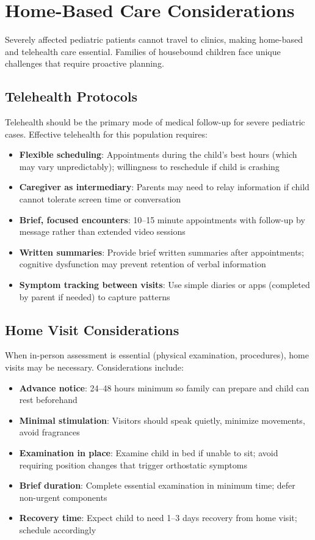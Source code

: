 \section{Home-Based Care Considerations}
\label{sec:ped-home-care}

Severely affected pediatric patients cannot travel to clinics, making home-based and telehealth care essential. Families of housebound children face unique challenges that require proactive planning.

\subsection{Telehealth Protocols}

Telehealth should be the primary mode of medical follow-up for severe pediatric cases. Effective telehealth for this population requires:

\begin{itemize}
    \item \textbf{Flexible scheduling}: Appointments during the child's best hours (which may vary unpredictably); willingness to reschedule if child is crashing
    \item \textbf{Caregiver as intermediary}: Parents may need to relay information if child cannot tolerate screen time or conversation
    \item \textbf{Brief, focused encounters}: 10--15 minute appointments with follow-up by message rather than extended video sessions
    \item \textbf{Written summaries}: Provide brief written summaries after appointments; cognitive dysfunction may prevent retention of verbal information
    \item \textbf{Symptom tracking between visits}: Use simple diaries or apps (completed by parent if needed) to capture patterns
\end{itemize}

\subsection{Home Visit Considerations}

When in-person assessment is essential (physical examination, procedures), home visits may be necessary. Considerations include:

\begin{itemize}
    \item \textbf{Advance notice}: 24--48 hours minimum so family can prepare and child can rest beforehand
    \item \textbf{Minimal stimulation}: Visitors should speak quietly, minimize movements, avoid fragrances
    \item \textbf{Examination in place}: Examine child in bed if unable to sit; avoid requiring position changes that trigger orthostatic symptoms
    \item \textbf{Brief duration}: Complete essential examination in minimum time; defer non-urgent components
    \item \textbf{Recovery time}: Expect child to need 1--3 days recovery from home visit; schedule accordingly
\end{itemize}

